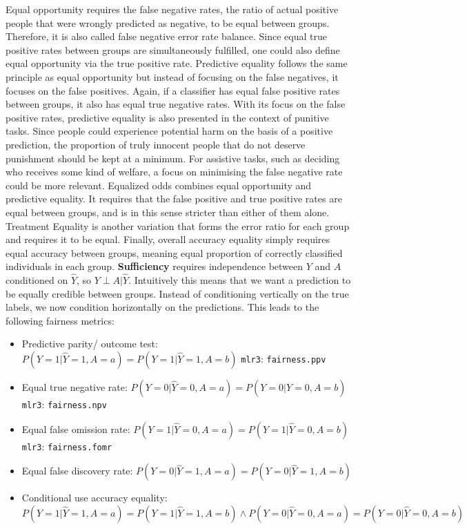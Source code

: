 Equal opportunity requires the false negative rates, the ratio of actual positive people that were wrongly predicted as negative, to be equal between groups. Therefore, it is also called false negative error rate balance. Since equal true positive rates between groups are simultaneously fulfilled, one could also define equal opportunity via the true positive rate.
Predictive equality follows the same principle as equal opportunity but instead of focusing on the false negatives, it focuses on the false positives. Again, if a classifier has equal false positive rates between groups, it also has equal true negative rates. With its focus on the false positive rates, predictive equality is also presented in the context of punitive tasks. Since people could experience potential harm on the basis of a positive prediction, the proportion of truly innocent people that do not deserve punishment should be kept at a minimum. For assistive tasks, such as deciding who receives some kind of welfare, a focus on minimising the false negative rate could be more relevant. 
Equalized odds combines equal opportunity and predictive equality. It requires that the false positive and true positive rates are equal between groups, and is in this sense stricter than either of them alone. Treatment Equality is another variation that forms the error ratio for each group and requires it to be equal. Finally, overall accuracy equality simply requires equal accuracy between groups, meaning equal proportion of correctly classified individuals in each group.
\textbf{Sufficiency} requires independence between $Y$ and $A$ conditioned on $\hat{Y}$, so $Y \perp A | \hat{Y}$. Intuitively this means that we want a prediction to be equally credible between groups. Instead of conditioning vertically on the true labels, we now condition horizontally on the predictions. This leads to the following fairness metrics:

\begin{itemize}
    \item Predictive parity/ outcome test: $P(Y = 1 | \hat{Y} = 1, A = a) = P(Y = 1 | \hat{Y} = 1, A = b)$ \texttt{mlr3}: \texttt{fairness.ppv}
    \item Equal true negative rate: $P(Y = 0 | \hat{Y} = 0, A = a) = P(Y = 0 | \hat{Y} = 0, A = b)$ \texttt{mlr3}: \texttt{fairness.npv}
    \item Equal false omission rate: $P(Y = 1 | \hat{Y} = 0, A = a) = P(Y = 1 | \hat{Y} = 0, A = b)$ \texttt{mlr3}: \texttt{fairness.fomr}
    \item Equal false discovery rate: $P(Y = 0 | \hat{Y} = 1, A = a) = P(Y = 0 | \hat{Y} = 1, A = b)$ 
    \item Conditional use accuracy equality: $P(Y = 1 | \hat{Y} = 1, A = a) = P(Y = 1 | \hat{Y} = 1, A = b) \land P(Y = 0 | \hat{Y} = 0, A = a) = P(Y = 0 | \hat{Y} = 0, A = b)$
\end{itemize}

